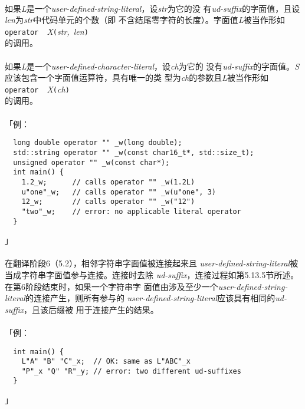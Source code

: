 \paragraph{}
如果\textit{L}是一个\textit{user-defined-string-literal}，设\textit{str}为它的没
有\textit{ud-suffix}的字面值，且设\textit{len}为\textit{str}中代码单元的个数（即
不含结尾零字符的长度）。字面值\textit{L}被当作形如                            \\
\mbox{\qquad\texttt{operator \dq\dq}\
  \textit{X}\texttt{(}\textit{str, len}\texttt{)}}                            \\
的调用。

\paragraph{}
如果\textit{L}是一个\textit{user-defined-character-literal}，设\textit{ch}为它的
没有\textit{ud-suffix}的字面值。\textit{S}应该包含一个字面值运算符，具有唯一的类
型为\textit{ch}的参数且\textit{L}被当作形如                                   \\
\mbox{\qquad\texttt{operator \dq\dq}\
  \textit{X}\texttt{(}\textit{ch}\texttt{)}}                                  \\
的调用。

\paragraph{}
「例：
\begin{lstlisting}
  long double operator "" _w(long double);
  std::string operator "" _w(const char16_t*, std::size_t);
  unsigned operator "" _w(const char*);
  int main() {
    1.2_w;      // calls operator "" _w(1.2L)
    u"one"_w;   // calls operator "" _w(u"one", 3)
    12_w;       // calls operator "" _w("12")
    "two"_w;    // error: no applicable literal operator
  }
\end{lstlisting}」

\paragraph{}
在翻译阶段6（5.2），相邻字符串字面值被连接起来且
\textit{user-defined-string-literal}被当成字符串字面值参与连接。连接时去除
\textit{ud-suffix}，连接过程如第5.13.5节所述。在第6阶段结束时，如果一个字符串字
面值由涉及至少一个\textit{user-defined-string-literal}的连接产生，则所有参与的
\textit{user-defined-string-literal}应该具有相同的\textit{ud-suffix}，且该后缀被
用于连接产生的结果。

\paragraph{}
「例：
\begin{lstlisting}
  int main() {
    L"A" "B" "C"_x;  // OK: same as L"ABC"_x
    "P"_x "Q" "R"_y; // error: two different ud-suffixes
  }
\end{lstlisting}」
